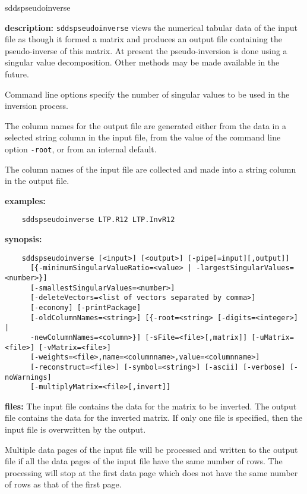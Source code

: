 \begin{sddsprog}{sddspseudoinverse}
  \item \textbf{description:} \verb|sddspseudoinverse| views the numerical tabular data of the input file as though it formed a matrix and produces an output file containing the pseudo-inverse of this matrix. At present the pseudo-inversion is done using a singular value decomposition. Other methods may be made available in the future.

  Command line options specify the number of singular values to be used in the inversion process.

  The column names for the output file are generated either from the data in a selected string column in the input file, from the value of the command line option \verb|-root|, or from an internal default.

  The column names of the input file are collected and made into a string column in the output file.

  \item \textbf{examples:}
    \begin{verbatim}
    sddspseudoinverse LTP.R12 LTP.InvR12
    \end{verbatim}
  \item \textbf{synopsis:}
    \begin{verbatim}
    sddspseudoinverse [<input>] [<output>] [-pipe[=input][,output]]
      [{-minimumSingularValueRatio=<value> | -largestSingularValues=<number>}]
      [-smallestSingularValues=<number>]
      [-deleteVectors=<list of vectors separated by comma>]
      [-economy] [-printPackage]
      [-oldColumnNames=<string>] [{-root=<string> [-digits=<integer>] |
      -newColumnNames=<column>}] [-sFile=<file>[,matrix]] [-uMatrix=<file>] [-vMatrix=<file>]
      [-weights=<file>,name=<columnname>,value=<columnname>]
      [-reconstruct=<file>] [-symbol=<string>] [-ascii] [-verbose] [-noWarnings]
      [-multiplyMatrix=<file>[,invert]]
    \end{verbatim}
  \item \textbf{files:}
    The input file contains the data for the matrix to be inverted. The output file contains the data for the inverted matrix. If only one file is specified, then the input file is overwritten by the output.

    Multiple data pages of the input file will be processed and written to the output file if all the data pages of the input file have the same number of rows. The processing will stop at the first data page which does not have the same number of rows as that of the first page.


\end{sddsprog}
